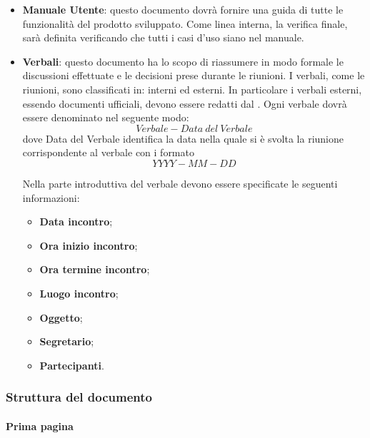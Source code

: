 \documentclass[../NormeDiProgetto.tex]{subfiles}
\begin{document}
\begin{itemize}
\item \textbf{Manuale Utente}: questo documento dovrà fornire una guida di tutte le funzionalità del prodotto sviluppato.
Come linea interna, la verifica finale, sarà definita verificando che tutti i casi d'uso siano nel manuale.
\item \textbf{Verbali}: questo documento ha lo scopo di riassumere in modo formale le discussioni effettuate e le decisioni
prese durante le riunioni. I verbali, come le riunioni, sono classificati in: interni ed esterni. In particolare i verbali esterni, essendo documenti ufficiali, devono essere redatti dal \responsabilediprogetto.
Ogni verbale dovrà essere denominato nel seguente modo:
\begin{equation*}
	Verbale-Data\ del\ Verbale
\end{equation*}
dove Data del Verbale identifica la data nella quale si è svolta la riunione corrispondente al verbale con i formato
\begin{equation*}
	YYYY-MM-DD
\end{equation*}

Nella parte introduttiva del verbale devono essere specificate le seguenti informazioni:
\begin{itemize}
  \item \textbf{Data incontro};
  \item \textbf{Ora inizio incontro};
  \item \textbf{Ora termine incontro};
  \item \textbf{Luogo incontro};
  \item \textbf{Oggetto};
  \item \textbf{Segretario};
  \item \textbf{Partecipanti}.
\end{itemize}
\end{itemize}
\subsubsection{Struttura del documento}
\paragraph{Prima pagina}
\end{document}
